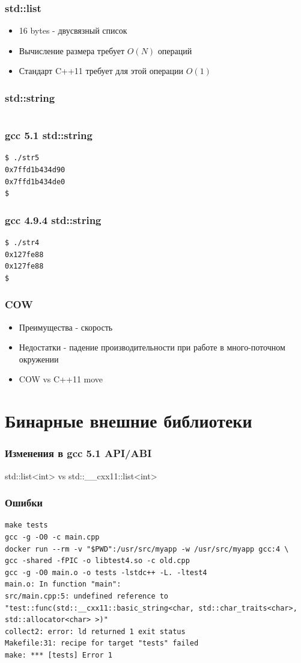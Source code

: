 \documentclass{beamer}
\begin{document}
\begin{frame}[fragile]
\frametitle{std::list}
\begin{itemize}
\item 16 bytes - двусвязный список
\item Вычисление размера требует $O(N)$ операций
\item Стандарт C++11 требует для этой операции $O(1)$
\end{itemize}
\end{frame}

\begin{frame}[fragile]
\frametitle{std::string}
\inputminted{c++}{../src/str.cpp}
\end{frame}

\begin{frame}[fragile]
\frametitle{gcc 5.1 std::string}
\begin{verbatim}
$ ./str5
0x7ffd1b434d90
0x7ffd1b434de0
$
\end{verbatim}
\end{frame}

\begin{frame}[fragile]
\frametitle{gcc 4.9.4 std::string}
\begin{verbatim}
$ ./str4
0x127fe88
0x127fe88
$
\end{verbatim}
\end{frame}


\begin{frame}[fragile]
\frametitle{COW}
\begin{itemize}
\item Преимущества - скорость
\item Недостатки - падение производительности при работе в
  много-поточном окружении
\item COW vs C++11 move
\end{itemize}
\end{frame}


\section{Бинарные внешние библиотеки}

\begin{frame}[fragile]
\frametitle{Изменения в gcc 5.1 API/ABI}
std::list<int> vs 
std::\_\_cxx11::list<int>
\end{frame}

\begin{frame}[fragile]
\frametitle{Ошибки}
\begin{verbatim}
make tests
gcc -g -O0 -c main.cpp 
docker run --rm -v "$PWD":/usr/src/myapp -w /usr/src/myapp gcc:4 \
gcc -shared -fPIC -o libtest4.so -c old.cpp
gcc -g -O0 main.o -o tests -lstdc++ -L. -ltest4
main.o: In function "main":
src/main.cpp:5: undefined reference to 
"test::func(std::__cxx11::basic_string<char, std::char_traits<char>, 
std::allocator<char> >)"
collect2: error: ld returned 1 exit status
Makefile:31: recipe for target "tests" failed
make: *** [tests] Error 1
\end{verbatim}
\end{frame}
\end{document}
